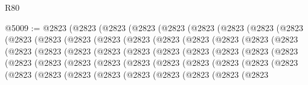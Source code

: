 \begin{lexlean}{R80}
\begin{coremodule}
@5009 := @2823
    (@2823
      (@2823
        (@2823
          (@2823
            (@2823
              (@2823
                (@2823
                  (@2823
                    (@2823
                      (@2823
                        (@2823
                          (@2823
                            (@2823
                              (@2823
                                (@2823
                                  (@2823
                                    (@2823
                                      (@2823
                                        (@2823
                                          (@2823
                                            (@2823
                                              (@2823
                                                (@2823
                                                  (@2823
                                                    (@2823
                                                      (@2823
                                                        (@2823
                                                          (@2823
                                                            (@2823
                                                              (@2823
                                                                (@2823
                                                                  (@2823
                                                                    (@2823
                                                                      (@2823
                                                                        (@2823
                                                                          (@2823
                                                                            (@2823
                                                                              (@2823
                                                                                (@2823
                                                                                  (@2823
                                                                                    (@2823
                                                                                      (@2823
                                                                                        (@2823
                                                                                          (@2823
                                                                                            (@2823
                                                                                              (@2823
                                                                                                (@2823

\end{coremodule}
\end{lexlean}
